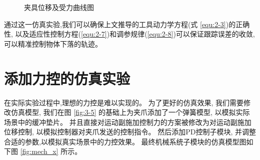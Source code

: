 \begin{figure}[!h]
  \centering
    \hspace{0pt}
  \caption{夹具位移及受力曲线图}
  \label{fig:4-8}
  \vspace{-0.3cm}
\end{figure}

通过这一仿真实验,我们可以确保上文推导的工具动力学方程(式 \ref{equ:2-3})的正确性,
以及适应性控制方程(\ref{equ:2-7})和调参规律(\ref{equ:2-8})可以保证跟踪误差的收敛,
可以精准控制物体下落的轨迹。


\section{添加力控的仿真实验}
在实际实验过程中,理想的力控是难以实现的。
为了更好的仿真效果, 我们需要修改仿真模型,
我们在图 \ref{fig:3-5} 的基础上为夹爪添加了一个弹簧模型, 以模拟实际场景中的缓冲垫片。
并且直接对运动副施加控制力的方案被修改为对运动副施加位移控制,
以模拟控制器对夹爪发送的控制指令。
然后添加PD控制子模块, 并调整合适的参数,以模拟真实场景中的力控效果。
最终机械系统子模块的仿真模型图如下图 \ref{fig:mech_x} 所示。

